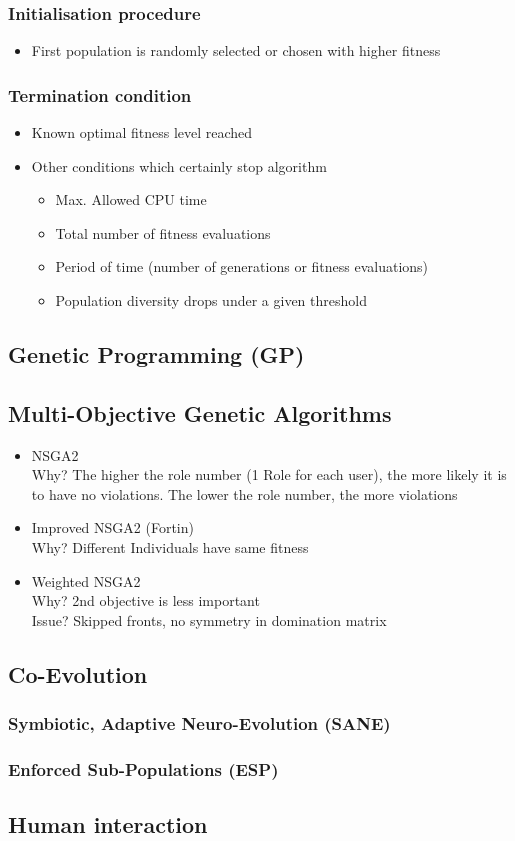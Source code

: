 \subsubsection{Initialisation procedure}
    \begin{itemize}
        \item First population is randomly selected or chosen with higher fitness 
    \end{itemize}
\subsubsection{Termination condition}
    \begin{itemize}
        \item Known optimal fitness level reached
        \item Other conditions which certainly stop algorithm
        \begin{itemize}
            \item Max. Allowed CPU time
            \item Total number of fitness evaluations
            \item Period of time (number of generations or fitness evaluations)
            \item Population diversity drops under a given threshold
        \end{itemize}
    \end{itemize}

\subsection{Genetic Programming (GP)}
\subsection{Multi-Objective Genetic Algorithms}
\begin{itemize}
    \item NSGA2\\
    Why? The higher the role number (1 Role for each user), the more likely it is to have no violations. The lower the role number, the more violations
    \item Improved NSGA2 (Fortin)\\
    Why? Different Individuals have same fitness
    \item Weighted NSGA2\\
    Why? 2nd objective is less important\\
    Issue? Skipped fronts, no symmetry in domination matrix
\end{itemize}

\subsection{Co-Evolution}
\subsubsection{Symbiotic, Adaptive Neuro-Evolution (SANE)}
\subsubsection{Enforced Sub-Populations (ESP)}

\subsection{Human interaction}
